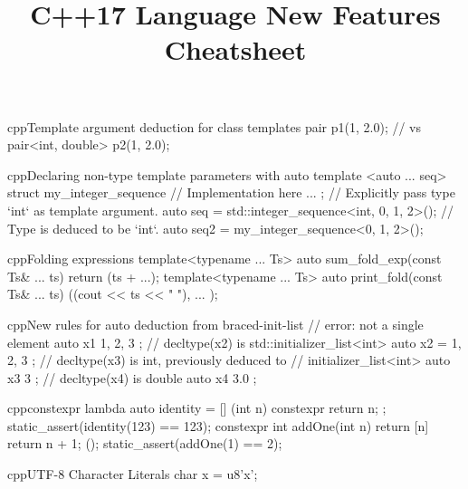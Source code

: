 \documentclass[10pt,a4paper]{article}
\title{\color{w3schools}C++17 Language New Features Cheatsheet
}
\begin{document}
\maketitle

\small
\begin{multicols}{3}

\thispagestyle{empty}
\scriptsize



\begin{codebox}{cpp}{Template argument deduction for class templates}
pair p1(1, 2.0);
// vs
pair<int, double> p2(1, 2.0);

\end{codebox}

\begin{codebox}{cpp}{Declaring non-type template parameters with auto}
template <auto ... seq>
struct my_integer_sequence {
  // Implementation here ...
};
// Explicitly pass type `int` as template argument.
auto seq = std::integer_sequence<int, 0, 1, 2>();
// Type is deduced to be `int`.
auto seq2 = my_integer_sequence<0, 1, 2>();

\end{codebox}

\begin{codebox}{cpp}{Folding expressions}
template<typename ... Ts>
auto sum_fold_exp(const Ts& ... ts) {
  return (ts + ...);
}
template<typename ... Ts>
auto print_fold(const Ts& ... ts)
{
  ((cout << ts << " "), ... );
}

\end{codebox}

\begin{codebox}{cpp}{New rules for auto deduction from braced-init-list}
// error: not a single element
auto x1{ 1, 2, 3 };
// decltype(x2) is std::initializer_list<int>
auto x2 = { 1, 2, 3 };
// decltype(x3) is int, previously deduced to
// initializer_list<int>
auto x3{ 3 };
// decltype(x4) is double
auto x4{ 3.0 };

\end{codebox}

\begin{codebox}{cpp}{constexpr lambda}
auto identity = [] (int n) constexpr { return n; };
static_assert(identity(123) == 123);
constexpr int addOne(int n) {
  return [n] { return n + 1; }();
}
static_assert(addOne(1) == 2);

\end{codebox}

\begin{codebox}{cpp}{UTF-8 Character Literals}
char x = u8'x';


\end{codebox}
\end{multicols}
\end{document}

